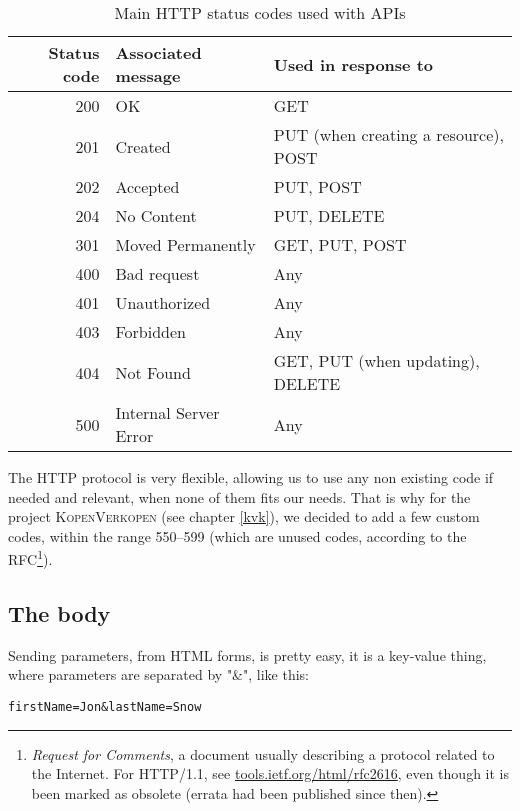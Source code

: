 \begin{table}[H]
  \begin{center}
    \noindent\begin{tabular}{ | r  l | l | }
      \hline
      Status code & Associated message & Used in response to\\
      \hline
      200 & OK                    & GET\\
      201 & Created               & PUT (when creating a resource), POST\\
      202 & Accepted              & PUT, POST\\
      204 & No Content            & PUT, DELETE\\
      301 & Moved Permanently     & GET, PUT, POST\\
      400 & Bad request           & Any\\
      401 & Unauthorized          & Any\\
      403 & Forbidden             & Any\\
      404 & Not Found             & GET, PUT (when updating), DELETE\\
      500 & Internal Server Error & Any\\
      \hline
    \end{tabular}
  \end{center}
  \caption[Main HTTP status codes used with APIs]{Main HTTP status codes used with APIs}
\end{table}

The HTTP protocol is very flexible, allowing us to use any non existing code if needed and relevant, when none of them fits our needs. That is why for the project \textsc{KopenVerkopen} (see chapter \ref{kvk}), we decided to add a few custom codes, within the range 550--599 (which are unused codes, according to the RFC\footnote{\textit{Request for Comments}, a document usually describing a protocol related to the Internet. For HTTP/1.1, see \href{https://tools.ietf.org/html/rfc2616}{tools.ietf.org/html/rfc2616}, even though it is been marked as obsolete (errata had been published since then).}).

\subsection{The body}

Sending parameters, from HTML forms, is pretty easy, it is a key-value thing, where parameters are separated by "\&", like this:

\begin{lstlisting}
firstName=Jon&lastName=Snow
\end{lstlisting}

